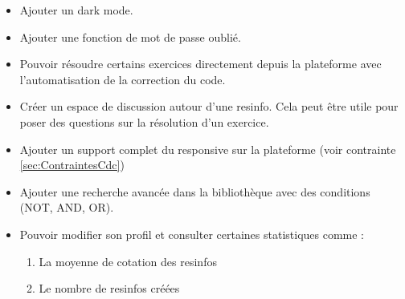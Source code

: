 \begin{itemize}
\begin{enumerate}
    \end{enumerate}
    \item Ajouter un dark mode.
    \item Ajouter une fonction de mot de passe oublié.
    \item Pouvoir résoudre certains exercices directement depuis la plateforme avec l'automatisation de la correction du code.
    \item Créer un espace de discussion autour d'une \gls{resinfo}. Cela peut être utile pour poser des questions sur la résolution d'un exercice.
    \item Ajouter un support complet du responsive sur la plateforme (voir contrainte \ref{sec:ContraintesCdc})
    \item Ajouter une recherche avancée dans la bibliothèque avec des conditions (NOT, AND, OR).
    \item Pouvoir modifier son profil et consulter certaines statistiques comme :
    \begin{enumerate}
        \item La moyenne de cotation des \glspl{resinfo}
        \item Le nombre de \glspl{resinfo} créées
    \end{enumerate}
\end{itemize}